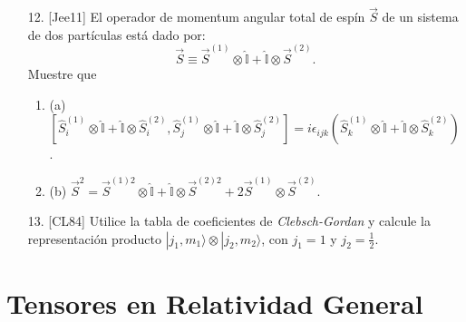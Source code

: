 \documentclass[a4paper,12pt]{article}
\begin{document}
\begin{enumerate}
    \item [12.] [Jee11] El operador de momentum angular total de espín $\vec{S}$ de un sistema de dos partículas está dado por:
    $$
    \vec{S} \equiv \vec{S}^{(1)} \otimes \hat{\mathbb{I}} + \hat{\mathbb{I}} \otimes \vec{S}^{(2)}.
    $$
    Muestre que
    \begin{enumerate}
        \item (a) $\left[ \hat{S}_i^{(1)} \otimes \hat{\mathbb{I}} + \hat{\mathbb{I}} \otimes \hat{S}_i^{(2)}, \hat{S}_j^{(1)} \otimes \hat{\mathbb{I}} + \hat{\mathbb{I}} \otimes \hat{S}_j^{(2)} \right] = i \epsilon_{ijk} (\hat{S}_k^{(1)} \otimes \hat{\mathbb{I}} + \hat{\mathbb{I}} \otimes \hat{S}_k^{(2)})$.
        \item (b) $\vec{S}^2 = \vec{S}^{(1)2} \otimes \hat{\mathbb{I}} + \hat{\mathbb{I}} \otimes \vec{S}^{(2)2} + 2 \vec{S}^{(1)} \otimes \vec{S}^{(2)}$.
    \end{enumerate}

    \item [13.] [CL84] Utilice la tabla de coeficientes de \textit{Clebsch-Gordan} y calcule la representación producto $|j_1, m_1\rangle \otimes |j_2, m_2\rangle$, con $j_1 = 1$ y $j_2 = \frac{1}{2}$.
\end{enumerate}

\section*{Tensores en Relatividad General}
\end{document}
